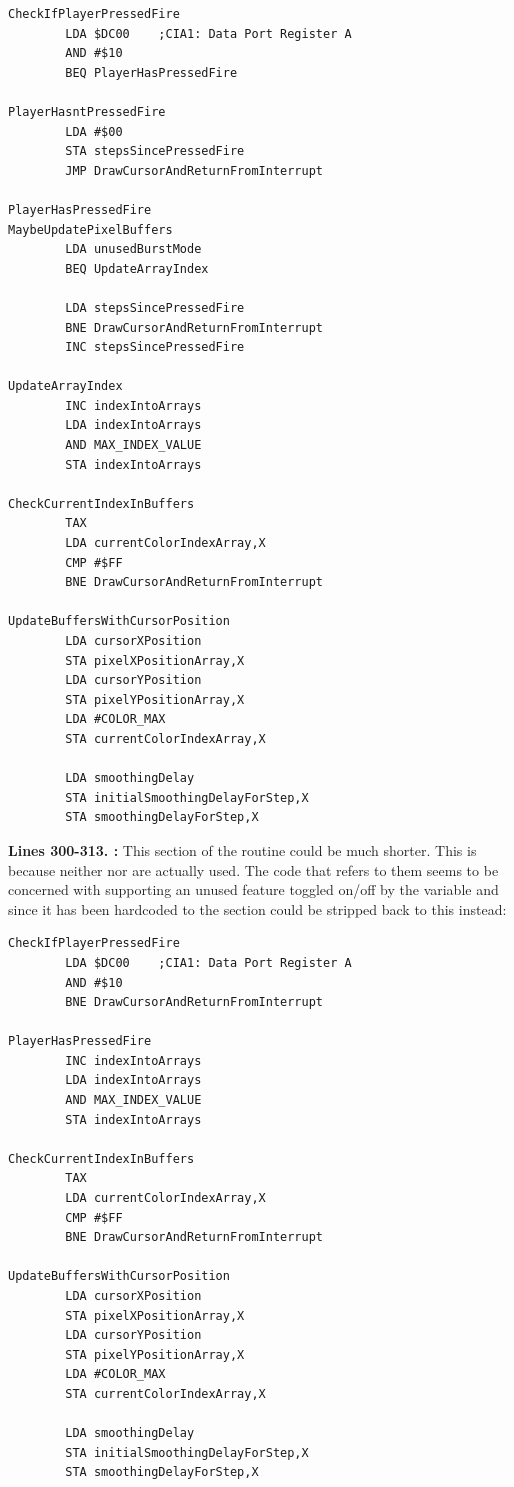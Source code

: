 \clearpage
\begin{lstlisting}[caption= Third part of the Interrupt Handler.]
CheckIfPlayerPressedFire   
        LDA $DC00    ;CIA1: Data Port Register A
        AND #$10
        BEQ PlayerHasPressedFire

PlayerHasntPressedFire
        LDA #$00
        STA stepsSincePressedFire
        JMP DrawCursorAndReturnFromInterrupt

PlayerHasPressedFire
MaybeUpdatePixelBuffers   
        LDA unusedBurstMode
        BEQ UpdateArrayIndex

        LDA stepsSincePressedFire
        BNE DrawCursorAndReturnFromInterrupt
        INC stepsSincePressedFire

UpdateArrayIndex   
        INC indexIntoArrays
        LDA indexIntoArrays
        AND MAX_INDEX_VALUE
        STA indexIntoArrays

CheckCurrentIndexInBuffers  
        TAX 
        LDA currentColorIndexArray,X
        CMP #$FF
        BNE DrawCursorAndReturnFromInterrupt

UpdateBuffersWithCursorPosition
        LDA cursorXPosition
        STA pixelXPositionArray,X
        LDA cursorYPosition
        STA pixelYPositionArray,X
        LDA #COLOR_MAX
        STA currentColorIndexArray,X

        LDA smoothingDelay
        STA initialSmoothingDelayForStep,X
        STA smoothingDelayForStep,X

\end{lstlisting}
\clearpage

\textbf{Lines 300-313. :} This section of the routine could be much shorter. This
is because neither  nor  are actually used. The code that refers
to them seems to be concerned with supporting an unused feature toggled on/off by the variable 
and since it has been hardcoded to  the section could be stripped back to this instead:

\begin{lstlisting}[basicstyle=\ttfamily\scriptsize]
CheckIfPlayerPressedFire   
        LDA $DC00    ;CIA1: Data Port Register A
        AND #$10
        BNE DrawCursorAndReturnFromInterrupt

PlayerHasPressedFire
        INC indexIntoArrays
        LDA indexIntoArrays
        AND MAX_INDEX_VALUE
        STA indexIntoArrays

CheckCurrentIndexInBuffers  
        TAX 
        LDA currentColorIndexArray,X
        CMP #$FF
        BNE DrawCursorAndReturnFromInterrupt

UpdateBuffersWithCursorPosition
        LDA cursorXPosition
        STA pixelXPositionArray,X
        LDA cursorYPosition
        STA pixelYPositionArray,X
        LDA #COLOR_MAX
        STA currentColorIndexArray,X

        LDA smoothingDelay
        STA initialSmoothingDelayForStep,X
        STA smoothingDelayForStep,X
\end{lstlisting}

